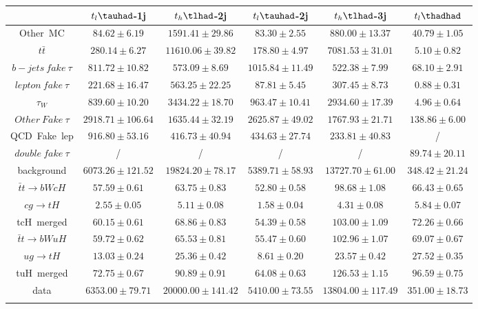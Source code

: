 \centering
\begin{tabular}{cccccc} \toprule\toprule
 & $t_{l}\tauhad$-1j & $t_{h}\tlhad$-2j & $t_{l}\tauhad$-2j & $t_{h}\tlhad$-3j & $t_{l}\thadhad$\\\midrule
\hspace{9mm}Other~MC & $84.62\pm6.19$ & $1591.41\pm29.86$ & $83.30\pm2.55$ & $880.00\pm13.37$ & $40.79\pm1.05$\\
\hspace{9mm}$t\bar{t}$ & $280.14\pm6.27$ & $11610.06\pm39.82$ & $178.80\pm4.97$ & $7081.53\pm31.01$ & $5.10\pm0.82$\\
\hspace{9mm}$b-jets~fake~\tau$ & $811.72\pm10.82$ & $573.09\pm8.69$ & $1015.84\pm11.49$ & $522.38\pm7.99$ & $68.10\pm2.91$\\
\hspace{9mm}$lepton~fake~\tau$ & $221.68\pm16.47$ & $563.25\pm22.25$ & $87.81\pm5.45$ & $307.45\pm8.73$ & $0.88\pm0.31$\\
\hspace{9mm}$\tau_{W}$ & $839.60\pm10.20$ & $3434.22\pm18.70$ & $963.47\pm10.41$ & $2934.60\pm17.39$ & $4.96\pm0.64$\\
\hspace{9mm}$Other~Fake~\tau$ & $2918.71\pm106.64$ & $1635.44\pm32.19$ & $2625.87\pm49.02$ & $1767.93\pm21.71$ & $138.86\pm6.00$\\
\hspace{9mm}QCD~Fake~lep & $916.80\pm53.16$ & $416.73\pm40.94$ & $434.63\pm27.74$ & $233.81\pm40.83$ &  /\\
\hspace{9mm}$double~fake~\tau$ &  / &  / &  / &  / & $89.74\pm20.11$\\
background & $6073.26\pm121.52$ & $19824.20\pm78.17$ & $5389.71\pm58.93$ & $13727.70\pm61.00$ & $348.42\pm21.24$\\\midrule
\hspace{9mm}$\bar{t}t\to bWcH$ & $57.59\pm0.61$ & $63.75\pm0.83$ & $52.80\pm0.58$ & $98.68\pm1.08$ & $66.43\pm0.65$\\
\hspace{9mm}$cg\to tH$ & $2.55\pm0.05$ & $5.11\pm0.08$ & $1.58\pm0.04$ & $4.31\pm0.08$ & $5.84\pm0.07$\\
tcH~merged & $60.15\pm0.61$ & $68.86\pm0.83$ & $54.39\pm0.58$ & $103.00\pm1.09$ & $72.26\pm0.66$\\
\hspace{9mm}$\bar{t}t\to bWuH$ & $59.72\pm0.62$ & $65.53\pm0.81$ & $55.47\pm0.60$ & $102.96\pm1.07$ & $69.07\pm0.67$\\
\hspace{9mm}$ug\to tH$ & $13.03\pm0.24$ & $25.36\pm0.42$ & $8.61\pm0.20$ & $23.57\pm0.42$ & $27.52\pm0.35$\\
tuH~merged & $72.75\pm0.67$ & $90.89\pm0.91$ & $64.08\pm0.63$ & $126.53\pm1.15$ & $96.59\pm0.75$\\\midrule
data & $6353.00\pm79.71$ & $20000.00\pm141.42$ & $5410.00\pm73.55$ & $13804.00\pm117.49$ & $351.00\pm18.73$\\
\bottomrule\bottomrule\\
\end{tabular}
